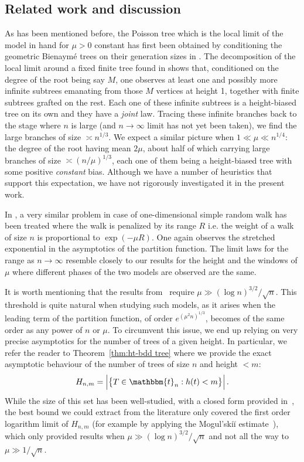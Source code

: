 \documentclass{article}
\newcommand{\bbt}{\mathbbm{t}}
\newcommand{\1}{\mathbbm{1}}								%
\theoremstyle{definition}
\numberwithin{equation}{section}
\begin{document}
\subsection{Related work and discussion}\label{sec:lit}
As has been mentioned before, the Poisson tree which is the local limit of the model in hand for $\mu > 0$ constant has first been obtained by conditioning the geometric Bienaymé trees on their {generation sizes} in \cite{abraham2015introduction}. The decomposition of the local limit around a fixed finite tree found in \cite[Theorem 4.4]{durhuus2023trees} shows that, conditioned on the degree of the root being say $M$, one observes at least one and possibly more infinite subtrees emanating from those $M$ vertices at height 1, together with finite subtrees grafted on the rest. Each one of these infinite subtrees is a height-biased tree on its own and they have a \emph{joint} law. Tracing these infinite branches back to the stage where $n$ is large (and  $n \to \infty$ limit has not yet been taken), we find the large branches of size ${\asymp} n^{1/3}$. We expect a similar picture when $1 \ll \mu \ll n^{1/4}$: the degree of the root having mean $2\mu$, about half of which carrying large branches of size ${\asymp} ( n/\mu)^{1/3}$, each one of them being a height-biased tree with some positive \emph{constant} bias. Although we have {a number of heuristics that support this expectation}, we have not rigorously investigated it in the present work.

In \cite{bouchot2024scaling}, a very similar problem in case of one-dimensional simple random walk has been treated where the walk is penalized by its range $R$ i.e. the weight of a walk of size $n$ is proportional to $\exp(-\mu R)$. One again observes the stretched exponential in the asymptotics of the partition function. The limit laws for the range as $n\to \infty$ resemble closely to our results for the height and the windows of $\mu$ where different phases of the two models are observed are the same.

It is worth mentioning that the results from~\cite{bouchot2024scaling} require $\mu\gg(\log n)^{3/2}/\sqrt{n}$.
This threshold is quite natural when studying such models, as it arises when the leading term of the partition function, of order $e^{(\mu^2n)^{1/3}}$, becomes of the same order as any power of $n$ or $\mu$.
To circumvent this issue, we end up relying on very precise asymptotics for the number of trees of a given height.
In particular, we refer the reader to Theorem~\ref{thm:ht-bdd tree} where we provide the exact asymptotic behaviour of the number of trees of size $n$ and height $<m$:
\begin{align}\label{eq:Hnm}
    H_{n,m}=\Big|\big\{T\in\bbt_n:h(t)<m\big\}\Big|\,.
\end{align}
While the size of this set has been well-studied, with a closed form provided in~\cite{de1972average}, the best bound we could extract from the literature only covered the first order logarithm limit of $H_{n,m}$ (for example by applying the Mogul’ski\u{i} estimate~\cite{mogul1975small}), which only provided results when $\mu\gg(\log n)^{3/2}/\sqrt{n}$ and not all the way to $\mu\gg1/\sqrt{n}$.
\color{black}
\end{document}
